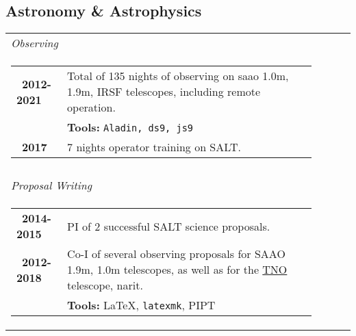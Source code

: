 \documentclass{article}
\newcommand{\tb}{\textbullet}
\newcommand{\saao}{\gls*{saao}\xspace}
\newcommand{\narit}{\gls*{narit}\xspace}
\begin{document}
\subsection*{Astronomy \& Astrophysics}
\begin{tabular}{l p{}}

  \emph{\large Observing}
  \\
  \multicolumn{2}{c}{\parbox{0.95\textwidth}{
    \begin{tabular}{p{0.15\linewidth}p{0.75\linewidth}}
      \tb \ {\bf 2012-2021}
      & Total of 135 nights of observing on \saao 1.0m, 1.9m, IRSF 
        telescopes, including remote operation. \\
      & {\bf Tools:} {\tt Aladin, ds9, js9} \\

      \tb \ {\bf 2017}
      & 7 nights operator training on SALT. \\
    \end{tabular}
  }}
  \\
  \\

  \emph{\large Proposal Writing}
  \\
  \multicolumn{2}{c}{\parbox{0.95\textwidth}{
    \begin{tabular}{p{0.15\linewidth}p{0.75\linewidth}}
      \tb \ {\bf 2014-2015} 
      & PI of 2 successful SALT science proposals.  \\
      \tb \ {\bf 2012-2018} 
      & Co-I of several observing proposals for SAAO 1.9m, 1.0m telescopes, as
        well as for the 
        \href{http://www.narit.or.th/en/index.php/facilities/thai-national-observatory-tno/overview}{TNO} 
        telescope, \narit. \\
      & {\bf Tools:} \LaTeX, {\tt latexmk}, PIPT
    \end{tabular}
  }}
\end{tabular}
\end{document}
